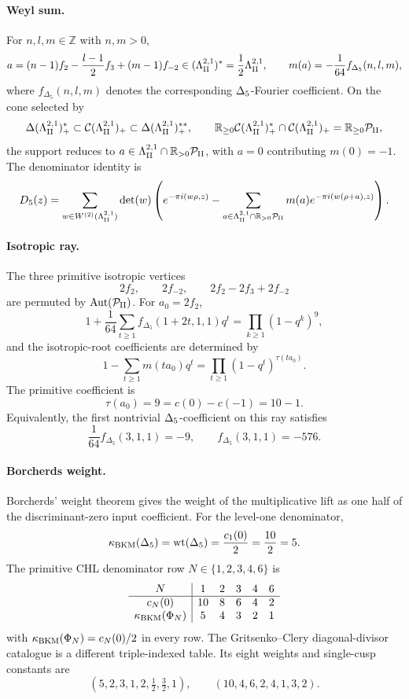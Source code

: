 \paragraph{Weyl sum.}
For \(n,l,m\in\mathbb Z\) with \(n,m>0\),
\[
  a=(n-1)f_2-\frac{l-1}{2}f_3+(m-1)f_{-2}
  \in(\Lambda^{2,1}_{\mathrm{II}})^*=\frac12\Lambda^{2,1}_{\mathrm{II}},
  \qquad
  m(a)=-\frac1{64}f_{\Delta_{5}}(n,l,m),
\]
where \(f_{\Delta_{5}}(n,l,m)\) denotes the corresponding
\(\Delta_{5}\)-Fourier coefficient.  On the cone selected by
\[
  \Delta(\Lambda^{2,1}_{\mathrm{II}})_+^*\subset \mathcal{C}(\Lambda^{2,1}_{\mathrm{II}})_+\subset \Delta(\Lambda^{2,1}_{\mathrm{II}})_+^{**},
  \qquad
  \mathbb R_{\ge0}\mathcal{C}(\Lambda^{2,1}_{\mathrm{II}})_+^*\cap\mathcal{C}(\Lambda^{2,1}_{\mathrm{II}})_+=\mathbb R_{\ge0}\mathcal{P}_{\mathrm{II}},
\]
the support reduces to \(a\in\Lambda^{2,1}_{\mathrm{II}}\cap\mathbb R_{>0}\mathcal{P}_{\mathrm{II}}\), with
\(a=0\) contributing \(m(0)=-1\).  The denominator identity is
\[
  D_5(z)=
  \sum_{w\in W^{(2)}(\Lambda^{2,1}_{\mathrm{II}})}\det(w)
  \left(
    e^{-\pi i(w\rho,z)}
    -
    \sum_{a\in\Lambda^{2,1}_{\mathrm{II}}\cap\mathbb R_{>0}\mathcal{P}_{\mathrm{II}}}
    m(a)e^{-\pi i(w(\rho+a),z)}
  \right).
\]

\paragraph{Isotropic ray.}
The three primitive isotropic vertices
\[
  2f_2,\qquad 2f_{-2},\qquad 2f_2-2f_3+2f_{-2}
\]
are permuted by \(\operatorname{Aut}(\mathcal{P}_{\mathrm{II}})\).  For
\(a_0=2f_2\),
\[
  1+\frac1{64}\sum_{t\ge1}f_{\Delta_{5}}(1+2t,1,1)q^t
  =
  \prod_{k\ge1}(1-q^k)^9,
\]
and the isotropic-root coefficients are determined by
\[
  1-\sum_{t\ge1}m(ta_0)q^t
  =
  \prod_{t\ge1}(1-q^t)^{\tau(ta_0)}.
\]
The primitive coefficient is
\[
  \tau(a_0)=9=c(0)-c(-1)=10-1.
\]
Equivalently, the first nontrivial \(\Delta_{5}\)-coefficient on this ray
satisfies
\[
  \frac1{64}f_{\Delta_{5}}(3,1,1)=-9,
  \qquad
  f_{\Delta_{5}}(3,1,1)=-576.
\]

\paragraph{Borcherds weight.}
Borcherds' weight theorem gives the weight of the multiplicative lift as
one half of the discriminant-zero input coefficient.  For the level-one
denominator,
\[
  \kappa_{\mathrm{BKM}}(\Delta_{5})=\operatorname{wt}(\Delta_{5})
  =\frac{c_1(0)}2=\frac{10}{2}=5.
\]
The primitive CHL denominator row \(N\in\{1,2,3,4,6\}\) is
\[
\begin{array}{c|ccccc}
N&1&2&3&4&6\\ \hline
c_N(0)&10&8&6&4&2\\
\kappa_{\mathrm{BKM}}(\Phi_N)&5&4&3&2&1
\end{array}
\]
with \(\kappa_{\mathrm{BKM}}(\Phi_N)=c_N(0)/2\) in every row.
The Gritsenko--Clery diagonal-divisor catalogue is a different
triple-indexed table.  Its eight weights and single-cusp constants are
\[
  (5,2,3,1,2,\tfrac12,\tfrac32,1),
  \qquad
  (10,4,6,2,4,1,3,2).
\]

